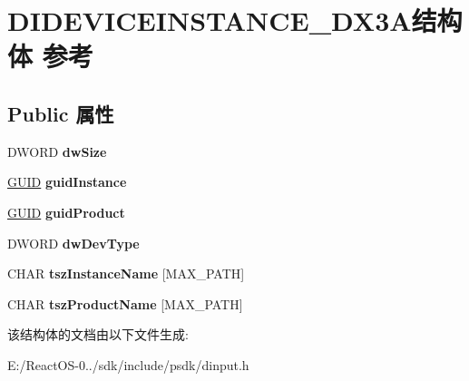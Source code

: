 \hypertarget{struct_d_i_d_e_v_i_c_e_i_n_s_t_a_n_c_e___d_x3_a}{}\section{D\+I\+D\+E\+V\+I\+C\+E\+I\+N\+S\+T\+A\+N\+C\+E\+\_\+\+D\+X3\+A结构体 参考}
\label{struct_d_i_d_e_v_i_c_e_i_n_s_t_a_n_c_e___d_x3_a}
\subsection*{Public 属性}
\begin{DoxyCompactItemize}
\item 
\mbox{\label{struct_d_i_d_e_v_i_c_e_i_n_s_t_a_n_c_e___d_x3_a_ac55458514c69aec0053dcd07ee93d29c}} 
D\+W\+O\+RD {\bfseries dw\+Size}
\item 
\mbox{\label{struct_d_i_d_e_v_i_c_e_i_n_s_t_a_n_c_e___d_x3_a_aea3ebfdfa1f3646b4e5ab56bf6de65bf}} 
\hyperlink{interface_g_u_i_d}{G\+U\+ID} {\bfseries guid\+Instance}
\item 
\mbox{\label{struct_d_i_d_e_v_i_c_e_i_n_s_t_a_n_c_e___d_x3_a_a215a2b09c2c5577ee48d575b0fe56614}} 
\hyperlink{interface_g_u_i_d}{G\+U\+ID} {\bfseries guid\+Product}
\item 
\mbox{\label{struct_d_i_d_e_v_i_c_e_i_n_s_t_a_n_c_e___d_x3_a_afb93f1f08151e3227308e4e97d6b2cdb}} 
D\+W\+O\+RD {\bfseries dw\+Dev\+Type}
\item 
\mbox{\label{struct_d_i_d_e_v_i_c_e_i_n_s_t_a_n_c_e___d_x3_a_a23bb703ff01cefa3e79d7ed59bf877b9}} 
C\+H\+AR {\bfseries tsz\+Instance\+Name} \mbox{[}M\+A\+X\+\_\+\+P\+A\+TH\mbox{]}
\item 
\mbox{\label{struct_d_i_d_e_v_i_c_e_i_n_s_t_a_n_c_e___d_x3_a_af4930830a47ee30c5cbcf7cbac2f700d}} 
C\+H\+AR {\bfseries tsz\+Product\+Name} \mbox{[}M\+A\+X\+\_\+\+P\+A\+TH\mbox{]}
\end{DoxyCompactItemize}


该结构体的文档由以下文件生成\+:\begin{DoxyCompactItemize}
\item 
E\+:/\+React\+O\+S-\/0../sdk/include/psdk/dinput.\+h\end{DoxyCompactItemize}
